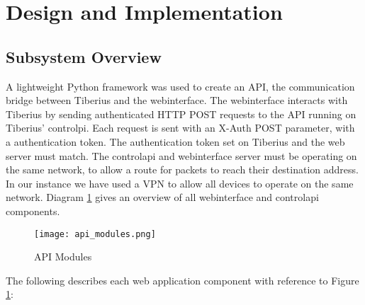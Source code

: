 \section{Design and Implementation}

\subsection{Subsystem Overview}
\label{sec:web_subsystem_overview}
A lightweight Python framework was used to create an API, the communication bridge between Tiberius and the \gls{webinterface}. The \gls{webinterface} interacts with Tiberius by sending authenticated \gls{HTTP} \gls{POST} requests to the \gls{API} running on Tiberius' \gls{controlpi}.
\newline
Each request is sent with an X-Auth \gls{POST} parameter, with a authentication token. The authentication token set on Tiberius and the web server must match.
\newline
The \gls{controlapi} and \gls{webinterface} server must be operating on the same network, to allow a route for packets to reach their destination address. In our instance we have used a \gls{VPN} to allow all devices to operate on the same network.
\newline
Diagram \ref{fig:api-modules} gives an overview of all \gls{webinterface} and \gls{controlapi} components.
\newline

\begin{figure}[!htb]
\begin{center}
\texttt{[image: api\_modules.png]}
\end{center}
\caption{API Modules}
\label{fig:api-modules}
\end{figure}

The following describes each web application component with reference to Figure \ref{fig:api-modules}:

